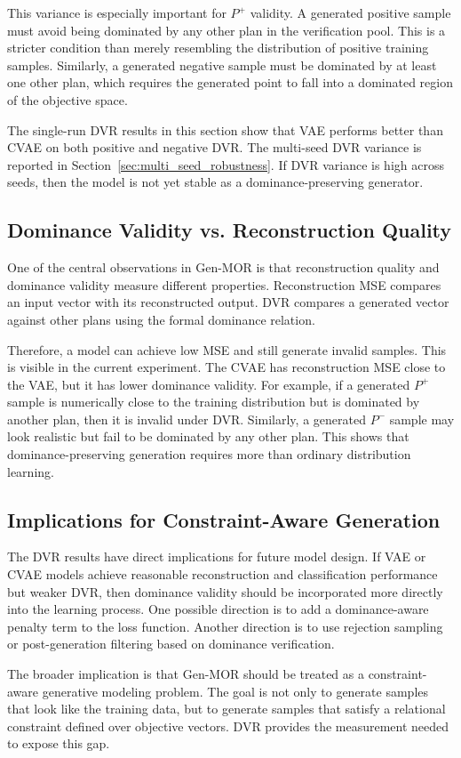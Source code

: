 This variance is especially important for $P^{+}$ validity. A generated positive sample must avoid being dominated by any other plan in the verification pool. This is a stricter condition than merely resembling the distribution of positive training samples. Similarly, a generated negative sample must be dominated by at least one other plan, which requires the generated point to fall into a dominated region of the objective space.

The single-run DVR results in this section show that VAE performs better than CVAE on both positive and negative DVR. The multi-seed DVR variance is reported in Section~\ref{sec:multi_seed_robustness}. If DVR variance is high across seeds, then the model is not yet stable as a dominance-preserving generator.

\subsection{Dominance Validity vs. Reconstruction Quality}
\label{subsec:dominance_vs_reconstruction}

One of the central observations in Gen-MOR is that reconstruction quality and dominance validity measure different properties. Reconstruction MSE compares an input vector with its reconstructed output. DVR compares a generated vector against other plans using the formal dominance relation.

Therefore, a model can achieve low MSE and still generate invalid samples. This is visible in the current experiment. The CVAE has reconstruction MSE close to the VAE, but it has lower dominance validity. For example, if a generated $P^{+}$ sample is numerically close to the training distribution but is dominated by another plan, then it is invalid under DVR. Similarly, a generated $P^{-}$ sample may look realistic but fail to be dominated by any other plan. This shows that dominance-preserving generation requires more than ordinary distribution learning.

\subsection{Implications for Constraint-Aware Generation}
\label{subsec:constraint_aware_generation_implications}

The DVR results have direct implications for future model design. If VAE or CVAE models achieve reasonable reconstruction and classification performance but weaker DVR, then dominance validity should be incorporated more directly into the learning process. One possible direction is to add a dominance-aware penalty term to the loss function. Another direction is to use rejection sampling or post-generation filtering based on dominance verification.

The broader implication is that Gen-MOR should be treated as a constraint-aware generative modeling problem. The goal is not only to generate samples that look like the training data, but to generate samples that satisfy a relational constraint defined over objective vectors. DVR provides the measurement needed to expose this gap.